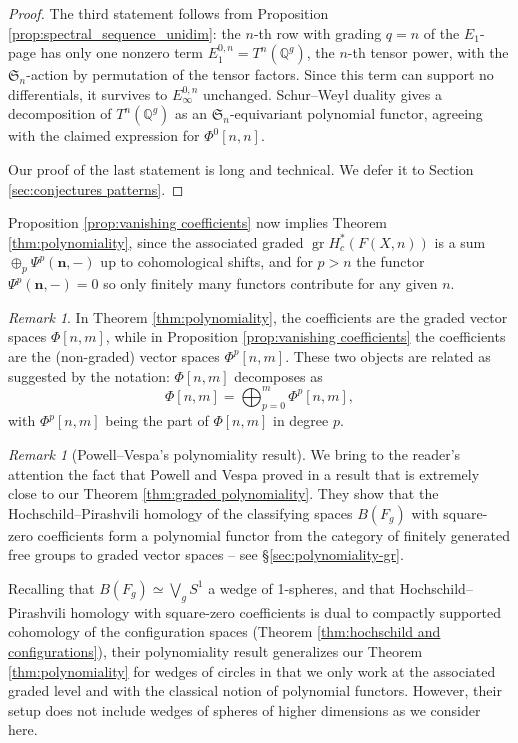 \documentclass[12pt]{article}
\newcommand{\Q}{\mathbb{Q}}
\newcommand{\SymGroup}[1][n]{\mathfrak{S}_{#1}}
\newcommand{\n}[1][n]{\mathbf{#1}}
\DeclareMathOperator{\gr}{gr}
\theoremstyle{plain}
\theoremstyle{definition}
\theoremstyle{remark}
\newtheorem{rmk}[thm]{Remark}
\begin{document}
\begin{proof}
    The third statement follows from Proposition \ref{prop:spectral_sequence_unidim}: the $n$-th row with grading $q=n$ of the $E_1$-page has only one nonzero term $E_1^{0,n} = T^n(\Q^g)$, the $n$-th tensor power, with the $\SymGroup$-action by permutation of the tensor factors. Since this term can support no differentials, it survives to $E_\infty^{0,n}$ unchanged. Schur--Weyl duality gives a decomposition of $T^n(\Q^g)$ as an $\SymGroup$-equivariant polynomial functor, agreeing with the claimed expression for $\Phi^0[n,n]$.
    
    Our proof of the last statement is long and technical. We defer it to Section \ref{sec:conjectures patterns}.
\end{proof}

Proposition \ref{prop:vanishing coefficients} now implies Theorem \ref{thm:polynomiality}, since the associated graded $\gr H^*_c(F(X,n))$ is a sum $\oplus_p \Psi^p(\n,-)$ up to cohomological shifts, and for $p > n$ the functor $\Psi^p(\n,-)=0$ so only finitely many functors contribute for any given $n$.

\begin{rmk}
    In Theorem \ref{thm:polynomiality}, the coefficients are the graded vector spaces $\Phi[n,m]$, while in Proposition \ref{prop:vanishing coefficients} the coefficients are the (non-graded) vector spaces $\Phi^p[n,m]$. These two objects are related as suggested by the notation: $\Phi[n,m]$ decomposes as
    \[
        \Phi[n,m] = \bigoplus_{p=0}^m{\Phi^p[n,m]},
    \]
    with $\Phi^p[n,m]$ being the part of $\Phi[n,m]$ in degree $p$.
\end{rmk}

\begin{rmk}[Powell--Vespa's polynomiality result]
We bring to the reader's attention the fact that Powell and Vespa proved in \cite[Theorem 5]{PV18} a result that is extremely close to our Theorem \ref{thm:graded polynomiality}. They show that the Hochschild--Pirashvili homology of the classifying spaces $B(F_g)$ with square-zero coefficients form a polynomial functor from the category of finitely generated free groups to graded vector spaces -- see  \S\ref{sec:polynomiality-gr}.

Recalling that $B(F_g)\simeq \bigvee_g S^1$ a wedge of 1-spheres, and that Hochschild--Pirashvili homology with square-zero coefficients is dual to compactly supported cohomology of the configuration spaces (Theorem \ref{thm:hochschild and configurations}),
their polynomiality result generalizes our Theorem \ref{thm:polynomiality} for wedges of circles in that we only work at the associated graded level and with the classical notion of polynomial functors. However, their setup does not include wedges of spheres of higher dimensions as we consider here. 
\end{rmk}
\end{document}
